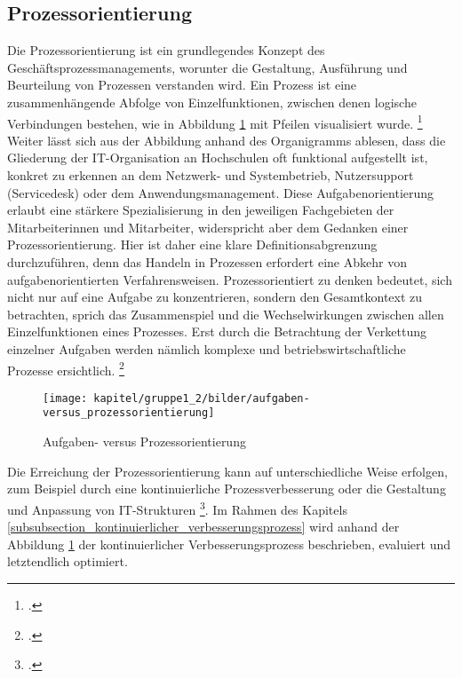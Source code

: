 \subsection{Prozessorientierung}
\label{subsection_prozessorientierung}
Die Prozessorientierung ist ein grundlegendes Konzept des Geschäftsprozessmanagements, worunter 
die Gestaltung, Ausführung und Beurteilung von Prozessen verstanden wird. Ein Prozess ist eine 
zusammenhängende Abfolge von Einzelfunktionen, zwischen denen logische Verbindungen bestehen, 
wie in Abbildung \ref{fig_aufgaben_vs_prozess} mit Pfeilen visualisiert wurde. 
\footcite[Vgl.][60]{krcmar_einfuhrung_2015} Weiter lässt sich aus der Abbildung anhand des 
Organigramms ablesen, dass die Gliederung der IT-Organisation an Hochschulen oft funktional 
aufgestellt ist, konkret zu erkennen an dem Netzwerk- und Systembetrieb, Nutzersupport (Servicedesk) 
oder dem Anwendungsmanagement. Diese Aufgabenorientierung erlaubt eine stärkere Spezialisierung 
in den jeweiligen Fachgebieten der Mitarbeiterinnen und Mitarbeiter, widerspricht aber dem Gedanken 
einer Prozessorientierung. Hier ist daher eine klare Definitionsabgrenzung durchzuführen, denn das 
Handeln in Prozessen erfordert eine Abkehr von aufgabenorientierten Verfahrensweisen. 
Prozessorientiert zu denken bedeutet, sich nicht nur auf eine Aufgabe zu konzentrieren, sondern den 
Gesamtkontext zu betrachten, sprich das Zusammenspiel und die Wechselwirkungen zwischen allen 
Einzelfunktionen eines Prozesses. Erst durch die Betrachtung der Verkettung einzelner Aufgaben 
werden nämlich komplexe und betriebswirtschaftliche Prozesse ersichtlich. 
\footcite[Vgl.][274]{heinrich_stelzer_2011}

\begin{figure}[h!]
	\centering
	\texttt{[image: kapitel/gruppe1\_2/bilder/aufgaben-versus\_prozessorientierung]} 
	\caption{Aufgaben- versus Prozessorientierung\protect\footnotemark}
	\label{fig_aufgaben_vs_prozess}
\end{figure}


Die Erreichung der Prozessorientierung kann auf unterschiedliche Weise erfolgen, zum Beispiel durch 
eine kontinuierliche Prozessverbesserung oder die Gestaltung und Anpassung von IT-Strukturen 
\footcite[Vgl.][45]{wissensmanagement_2010}. Im Rahmen des Kapitels 
\ref{subsubsection_kontinuierlicher_verbesserungsprozess}  wird anhand der Abbildung \ref{fig_aufgaben_vs_prozess} der kontinuierlicher Verbesserungsprozess beschrieben, evaluiert und letztendlich optimiert.


